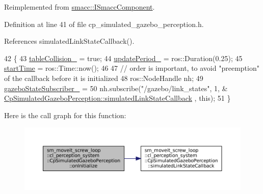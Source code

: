 Reimplemented from \hyperlink{classsmacc_1_1ISmaccComponent_ae6f71d008db12553912e9436184b9e65}{smacc\+::\+I\+Smacc\+Component}.



Definition at line 41 of file cp\+\_\+simulated\+\_\+gazebo\+\_\+perception.\+h.



References simulated\+Link\+State\+Callback().


\begin{DoxyCode}
42             \{                
43                 \hyperlink{classsm__moveit__screw__loop_1_1cl__perception__system_1_1CpSimulatedGazeboPerception_ace3eaa225e7d0ee89cadc2f2aa009037}{tableCollision\_} = \textcolor{keyword}{true};
44                 \hyperlink{classsm__moveit__screw__loop_1_1cl__perception__system_1_1CpSimulatedGazeboPerception_ad3006649b94562b4539b92ff226dea93}{updatePeriod\_} = ros::Duration(0.25);
45                 \hyperlink{classsm__moveit__screw__loop_1_1cl__perception__system_1_1CpSimulatedGazeboPerception_a00f3154b01ae28cc89b260d6c6d790f5}{startTime} = ros::Time::now();
46                 
47                 \textcolor{comment}{// order is important, to avoid "preemption" of the callback before it is initialized}
48                 ros::NodeHandle nh;
49                 \hyperlink{classsm__moveit__screw__loop_1_1cl__perception__system_1_1CpSimulatedGazeboPerception_a4f7d697972bf37517475d8f4989187a6}{gazeboStateSubscriber\_} =
50                     nh.subscribe(\textcolor{stringliteral}{"/gazebo/link\_states"}, 1, &
      \hyperlink{classsm__moveit__screw__loop_1_1cl__perception__system_1_1CpSimulatedGazeboPerception_a430e4834d41a548427c0f9af3f03a2f3}{CpSimulatedGazeboPerception::simulatedLinkStateCallback}
      , \textcolor{keyword}{this});
51             \}
\end{DoxyCode}
Here is the call graph for this function\+:
\nopagebreak
\begin{figure}[H]
\begin{center}
\leavevmode
\includegraphics[width=350pt]{classsm__moveit__screw__loop_1_1cl__perception__system_1_1CpSimulatedGazeboPerception_a7a683c96ef7ea9e26e856f104c3b8249_cgraph}
\end{center}
\end{figure}

